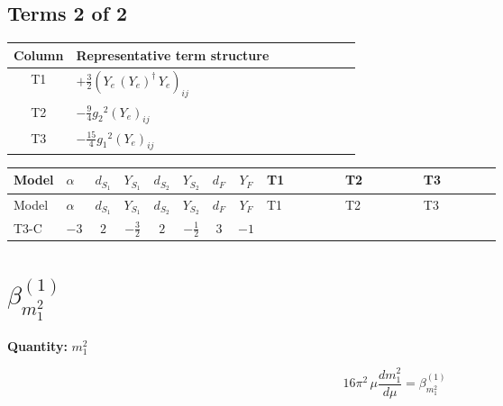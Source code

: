 \documentclass[8pt]{article}
\begin{document}
\begin{landscape}
\subsection*{Terms 2 of 2}
\begin{center}
\begin{tabular}{@{}c >{\raggedright\arraybackslash}p{0.82\linewidth}@{}}
\toprule
Column & Representative term structure \\
\midrule
T1 & \(\displaystyle +\frac{3}{2} \left({Y_e}\,\left({Y_e}\right)^{\dagger}\,{Y_e}\right)_{ij}\) \\
\midrule
T2 & \(\displaystyle -\frac{9}{4} {g_2}^2 \left({Y_e}\right)_{ij}\) \\
\midrule
T3 & \(\displaystyle -\frac{15}{4} {g_1}^2 \left({Y_e}\right)_{ij}\) \\
\midrule
\bottomrule
\end{tabular}
\end{center}
\smallskip
\tiny
\begin{longtable}{@{}llcccccc >{\raggedright\arraybackslash}p{0.21\linewidth} >{\raggedright\arraybackslash}p{0.21\linewidth} >{\raggedright\arraybackslash}p{0.21\linewidth}@{}}
\toprule
Model & $\alpha$ & $d_{S_1}$ & $Y_{S_1}$ & $d_{S_2}$ & $Y_{S_2}$ & $d_F$ & $Y_F$ & T1 & T2 & T3 \\
\midrule
\endfirsthead
\toprule
Model & $\alpha$ & $d_{S_1}$ & $Y_{S_1}$ & $d_{S_2}$ & $Y_{S_2}$ & $d_F$ & $Y_F$ & T1 & T2 & T3 \\
\midrule
\endhead
T3-C & $-3$ & $2$ & $-\frac{3}{2}$ & $2$ & $-\frac{1}{2}$ & $3$ & $-1$ & \scriptsize\adjustbox{max width=\linewidth}{$\begin{gathered} +\frac{3}{2} \left({Y_e}\,\left({Y_e}\right)^{\dagger}\,{Y_e}\right)_{ij}\end{gathered}$} & \scriptsize\adjustbox{max width=\linewidth}{$\begin{gathered} -\frac{9}{4} {g_2}^2 \left({Y_e}\right)_{ij}\end{gathered}$} & \scriptsize\adjustbox{max width=\linewidth}{$\begin{gathered} -\frac{15}{4} {g_1}^2 \left({Y_e}\right)_{ij}\end{gathered}$} \\
\midrule
\bottomrule
\end{longtable}
\clearpage
\section*{$\beta_{m_1^2}^{(1)}$}
\noindent\textbf{Quantity: }$m_1^2$\par\smallskip
\[16\pi^2\,\mu\frac{d m_1^2}{d\mu}=\beta_{m_1^2}^{(1)}\]

\end{landscape}
\end{document}
